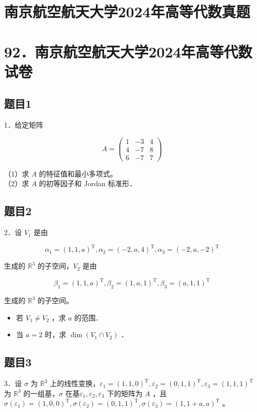 \documentclass{article}
\begin{document}
\section*{南京航空航天大学2024年高等代数真题}
\section*{92．南京航空航天大学2024年高等代数试卷}

\subsection{题目1}
1．给定矩阵

\[
A=\left(\begin{array}{lll}
1 & -3 & 4 \\
4 & -7 & 8 \\
6 & -7 & 7
\end{array}\right)
\]

（1）求 \(A\) 的特征值和最小多项式。\\
（2）求 \(A\) 的初等因子和 Jordan 标准形．

\subsection{题目2}
2．设 \(V_{1}\) 是由

\[
\alpha_{1}=(1,1, a)^{\mathrm{T}}, \alpha_{2}=(-2, a, 4)^{\mathrm{T}}, \alpha_{3}=(-2, a,-2)^{\mathrm{T}}
\]

生成的 \(\mathbb{R}^{3}\) 的子空间，\(V_{2}\) 是由

\[
\beta_{1}=(1,1, a)^{\mathrm{T}}, \beta_{2}=(1, a, 1)^{\mathrm{T}}, \beta_{3}=(a, 1,1)^{\mathrm{T}}
\]

生成的 \(\mathbb{R}^{3}\) 的子空间。

\begin{itemize}
  \item[（1）] 若 \(V_{1} \neq V_{2}\) ，求 \(a\) 的范围．
  \item[（2）] 当 \(a=2\) 时，求 \(\operatorname{dim}\left(V_{1} \cap V_{2}\right)\) ．
\end{itemize}

\subsection{题目3}
3．设 \(\sigma\) 为 \(\mathbb{R}^{3}\) 上的线性变换，\(\varepsilon_{1}=(1,1,0)^{\mathrm{T}}, \varepsilon_{2}=(0,1,1)^{\mathrm{T}}, \varepsilon_{3}=(1,1,1)^{\mathrm{T}}\) 为 \(\mathbb{R}^{3}\) 的一组基，\(\sigma\) 在基\(\varepsilon_{1}, \varepsilon_{2}, \varepsilon_{3}\) 下的矩阵为 \(A\) ，且 \(\sigma\left(\varepsilon_{1}\right)=(1,0,0)^{\mathrm{T}}, \sigma\left(\varepsilon_{2}\right)=(0,1,1)^{\mathrm{T}}, \sigma\left(\varepsilon_{3}\right)=(1,1+a, a)^{\mathrm{T}}\) 。
\end{document}

